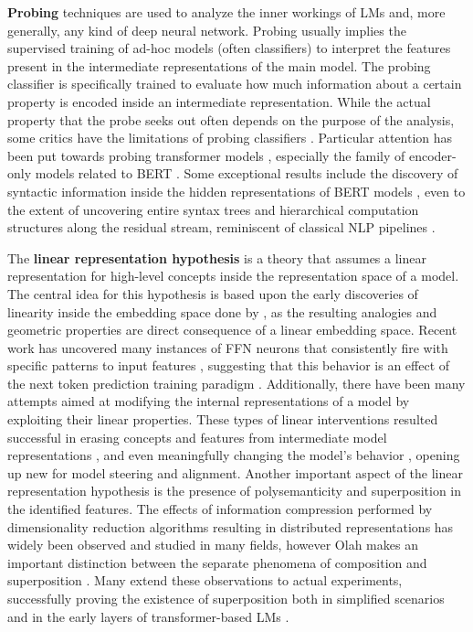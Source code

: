 \textbf{Probing} techniques are used to analyze the inner workings of LMs and, more generally, any kind of deep neural network.
Probing usually implies the supervised training of ad-hoc models (often classifiers) to interpret the features present in the intermediate representations of the main model.
The probing classifier is specifically trained to evaluate how much information about a certain property is encoded inside an intermediate representation.
While the actual property that the probe seeks out often depends on the purpose of the analysis, some critics have  the limitations of probing classifiers \cite{belinkov2022}.
Particular attention has been put towards probing transformer models \cite{chwang2024, zou2023, macdiarmid2024, burns2024}, especially the family of encoder-only models related to BERT \cite{devlin2018}.
Some exceptional results include the discovery of syntactic information inside the hidden representations of BERT models \cite{tenney2019a, lin2019, liu2019}, even to the extent of uncovering entire syntax trees \cite{hewitt2019} and hierarchical computation structures along the residual stream, reminiscent of classical NLP pipelines \cite{tenney2019b}.


The \textbf{linear representation hypothesis} \cite{park2023} is a theory that assumes a linear representation for high-level concepts inside the representation space of a model.
The central idea for this hypothesis is based upon the early discoveries of linearity inside the embedding space done by \citet{mikolov2013}, as the resulting analogies and geometric properties are direct consequence of a linear embedding space.
Recent work has uncovered many instances of FFN neurons that consistently fire with specific patterns  to input features \cite{voita2023}, suggesting that this behavior is an effect of the next token prediction training paradigm \cite{jiang2024}.
Additionally, there have been many attempts aimed at modifying the internal representations of a model by exploiting their linear properties.
These types of linear interventions resulted successful in erasing concepts and features from intermediate model representations \cite{ravfogel2020, ravfogel2022, belrose2023b}, and even meaningfully changing the model's behavior \cite{nanda2023, belrose2023b}, opening up new  for model steering and alignment. 
Another important aspect of the linear representation hypothesis is the presence of polysemanticity and superposition in the identified features.
The effects of information compression performed by dimensionality reduction algorithms resulting in distributed representations has widely been observed and studied in many fields, however Olah makes an important distinction between the separate phenomena of composition and superposition \cite{olah2023}.
Many extend these observations to actual experiments, successfully proving the existence of superposition both in simplified scenarios \cite{elhage2022, arora2018} and in the early layers of transformer-based LMs \cite{gurnee2023}.

